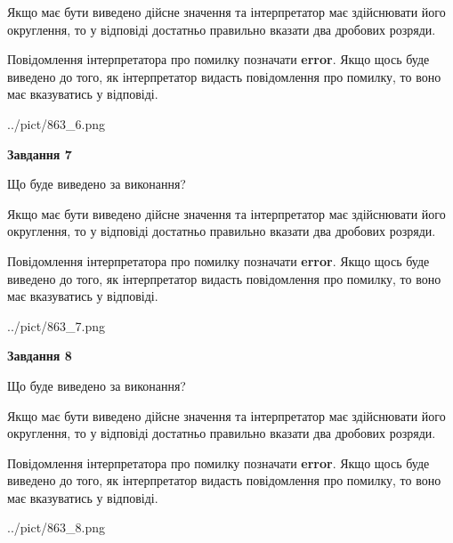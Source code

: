 \documentclass[12pt, ukrainian]{article}
\begin{document}
{\begin {Large}
Якщо має бути виведено дійсне значення та інтерпретатор має здійснювати його округлення, 
то у відповіді достатньо правильно вказати два дробових розряди.

Повідомлення інтерпретатора про помилку позначати \textbf{error}.
Якщо щось буде виведено до того, як інтерпретатор видасть повідомлення про помилку, 
то воно має вказуватись у відповіді. \par

\begin{center}
	{../pict/863_6.png}
\end{center}
\newpage

{\begin {center}\textbf{Завдання 7}\end {center}}\par
Що буде виведено за виконання? \par

Якщо має бути виведено дійсне значення та інтерпретатор має здійснювати його округлення, 
то у відповіді достатньо правильно вказати два дробових розряди.

Повідомлення інтерпретатора про помилку позначати \textbf{error}.
Якщо щось буде виведено до того, як інтерпретатор видасть повідомлення про помилку, 
то воно має вказуватись у відповіді. \par

\begin{center}
	{../pict/863_7.png}
\end{center}
\newpage

{\begin {center}\textbf{Завдання 8}\end {center}}\par
Що буде виведено за виконання? \par

Якщо має бути виведено дійсне значення та інтерпретатор має здійснювати його округлення, 
то у відповіді достатньо правильно вказати два дробових розряди.

Повідомлення інтерпретатора про помилку позначати \textbf{error}.
Якщо щось буде виведено до того, як інтерпретатор видасть повідомлення про помилку, 
то воно має вказуватись у відповіді. \par

\begin{center}
	{../pict/863_8.png}
\end{center}
\newpage


\end{Large}}
\end{document}
